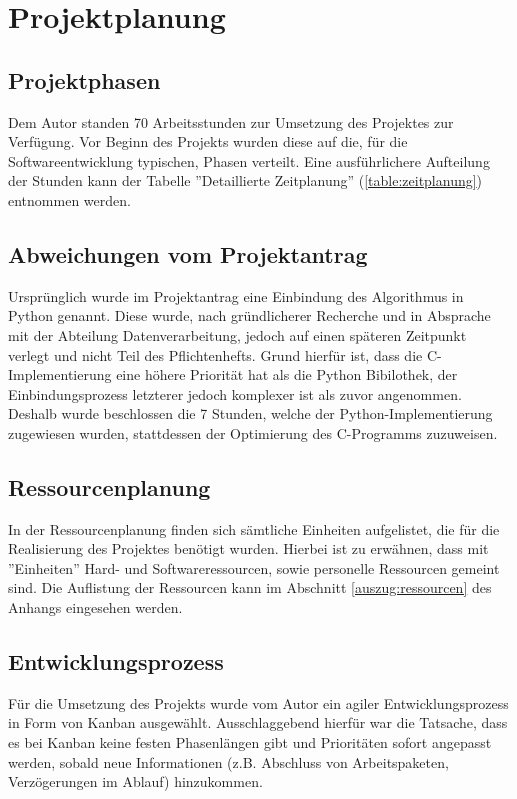 \section{Projektplanung}
\label{section:projektplanung}
\subsection{Projektphasen}
Dem Autor standen 70 Arbeitsstunden zur Umsetzung des Projektes zur Verfügung.
Vor Beginn des Projekts wurden diese auf die, für die Softwareentwicklung
typischen, Phasen verteilt. Eine ausführlichere Aufteilung der Stunden kann der Tabelle
''Detaillierte Zeitplanung'' (\ref{table:zeitplanung}) entnommen werden.



\subsection{Abweichungen vom Projektantrag}
Ursprünglich wurde im Projektantrag eine Einbindung des Algorithmus in
Python genannt. Diese wurde, nach gründlicherer Recherche und in Absprache mit der
Abteilung Datenverarbeitung, jedoch auf einen späteren Zeitpunkt verlegt und nicht
Teil des Pflichtenhefts. Grund hierfür ist, dass die C-Implementierung eine höhere
Priorität hat als die Python Bibilothek, der Einbindungsprozess letzterer jedoch komplexer
ist als zuvor angenommen.
Deshalb wurde beschlossen die 7 Stunden, welche der Python-Implementierung
zugewiesen wurden, stattdessen der Optimierung des C-Programms zuzuweisen.

\subsection{Ressourcenplanung}
In der Ressourcenplanung finden sich sämtliche Einheiten aufgelistet, die für
 die Realisierung des Projektes benötigt wurden. Hierbei ist zu erwähnen, dass mit ''Einheiten'' Hard- und Softwareressourcen, sowie personelle Ressourcen gemeint sind.
 Die Auflistung der Ressourcen kann im Abschnitt \ref{auszug:ressourcen} des Anhangs eingesehen werden.

\subsection{Entwicklungsprozess}
Für die Umsetzung des Projekts wurde vom Autor ein agiler Entwicklungsprozess in
Form von Kanban ausgewählt. Ausschlaggebend hierfür war die Tatsache, dass es bei Kanban
keine festen Phasenlängen gibt und Prioritäten sofort angepasst werden, sobald
neue Informationen (z.B. Abschluss von Arbeitspaketen, Verzögerungen im Ablauf) hinzukommen.\par

